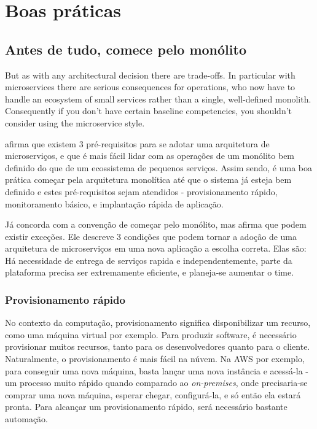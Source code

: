 \chapter{Boas práticas}\label{chapter-boas-praticas}


\section{Antes de tudo, comece pelo monólito}

\begin{citacao}
But as with any architectural decision there are trade-offs. In particular with microservices there are serious consequences for operations, who now have to handle an ecosystem of small services rather than a single, well-defined monolith. Consequently if you don't have certain baseline competencies, you shouldn't consider using the microservice style. \cite{MartinFowlerMicroservices}
\end{citacao}

 afirma que existem 3 pré-requisitos para se adotar uma arquitetura de microserviços, e que é mais fácil lidar com as operações de um monólito bem definido do que de um ecossistema de pequenos serviços. Assim sendo, é uma boa prática começar pela arquitetura monolítica até que o sistema já esteja bem definido e estes pré-requisitos sejam atendidos - provisionamento rápido, monitoramento básico, e implantação rápida de aplicação.

Já \cite{monolith-or-microservices} concorda com a convenção de começar pelo monólito, mas afirma que podem existir exceções. Ele descreve 3 condições que podem tornar a adoção de uma arquitetura de microserviços em uma nova aplicação a escolha correta. Elas são: Há necessidade de entrega de serviços rapida e independentemente, parte da plataforma precisa ser extremamente eficiente, e planeja-se aumentar o time.

\subsection{Provisionamento rápido}

No contexto da computação, provisionamento significa disponibilizar um recurso, como uma máquina virtual por exemplo. Para produzir software, é necessário provisionar muitos recursos, tanto para os desenvolvedores quanto para o cliente. Naturalmente, o provisionamento é mais fácil na núvem. Na AWS por exemplo, para conseguir uma nova máquina, basta lançar uma nova instância e acessá-la - um processo muito rápido quando comparado ao \emph{on-premises}, onde precisaria-se comprar uma nova máquina, esperar chegar, configurá-la, e só então ela estará pronta. Para alcançar um provisionamento rápido, será necessário bastante automação. \cite{MartinFowlerMicroservices}


